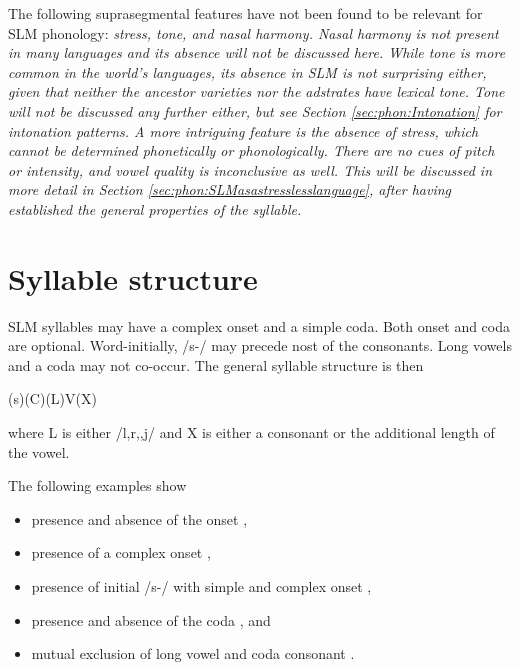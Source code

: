 The following suprasegmental features have not been found to be relevant for SLM phonology: \em stress, tone, \em and \em nasal harmony\em.
Nasal harmony is not present in many languages and its absence will not be discussed here.
While tone is more common in the world's languages, its absence in SLM is not surprising either, given that neither the ancestor varieties nor the adstrates have lexical tone. Tone will not be discussed any further either, but see Section \ref{sec:phon:Intonation} for intonation patterns.
 A more intriguing feature is the absence of stress, which cannot be determined phonetically or phonologically. There are no cues of pitch or intensity, and vowel quality is inconclusive as well. This will be discussed in more detail in Section \ref{sec:phon:SLMasastresslesslanguage}, after having established the general properties of the syllable.


\section{Syllable structure}\label{sec:phon:Syllablestructure}
SLM syllables may have a complex onset and a simple coda. Both onset and coda are optional.  Word-initially,  /s-/ may precede nost of the consonants. Long vowels and a coda may not co-occur. The general syllable structure is then

\ea (s)(C)(L)V(X)\z

where L is either /l,r,\V,j/ and X is either a consonant or the additional length of the vowel.

The following examples show
\begin{itemize}
 \item   presence and absence of the onset ,
 \item   presence of a complex onset ,
 \item   presence of initial /s-/ with simple and complex onset ,
 \item   presence and absence of the coda ,   and
 \item   mutual exclusion of long vowel and coda consonant .
\end{itemize}



